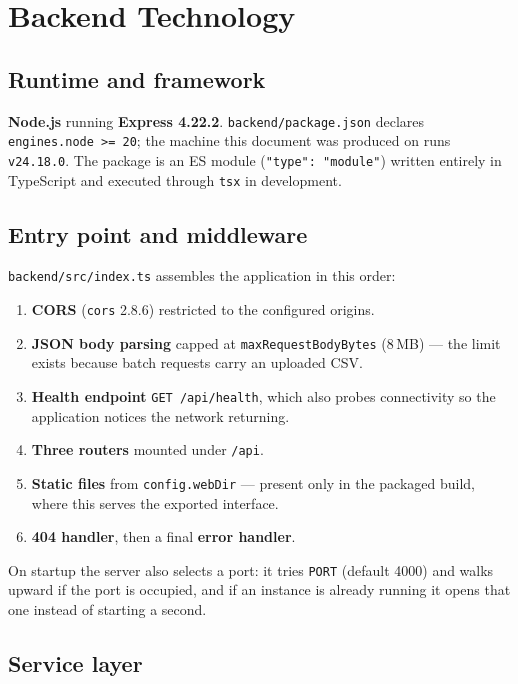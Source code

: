 \documentclass[11pt,a4paper]{report}
\newcommand{\code}[1]{\texttt{\small #1}}
\DeclareRobustCommand{\file}[1]{{\small\nolinkurl{#1}}}
\newcommand{\ver}[1]{\texttt{#1}}
\begin{document}
\chapter{Backend Technology}
\label{sec:backend}

\section{Runtime and framework}

\textbf{Node.js} running \textbf{Express 4.22.2}. \file{backend/package.json}
declares \code{engines.node >= 20}; the machine this document was produced on runs
\ver{v24.18.0}. The package is an ES module (\code{"type": "module"}) written
entirely in TypeScript and executed through \code{tsx} in development.

\section{Entry point and middleware}

\file{backend/src/index.ts} assembles the application in this order:

\begin{enumerate}
\item \textbf{CORS} (\code{cors} 2.8.6) restricted to the configured origins.
\item \textbf{JSON body parsing} capped at \code{maxRequestBodyBytes} (8\,MB) ---
the limit exists because batch requests carry an uploaded CSV.
\item \textbf{Health endpoint} \code{GET /api/health}, which also probes
connectivity so the application notices the network returning.
\item \textbf{Three routers} mounted under \code{/api}.
\item \textbf{Static files} from \code{config.webDir} --- present only in the
packaged build, where this serves the exported interface.
\item \textbf{404 handler}, then a final \textbf{error handler}.
\end{enumerate}

On startup the server also selects a port: it tries \code{PORT} (default 4000)
and walks upward if the port is occupied, and if an instance is already running
it opens that one instead of starting a second.

\section{Service layer}
\end{document}
